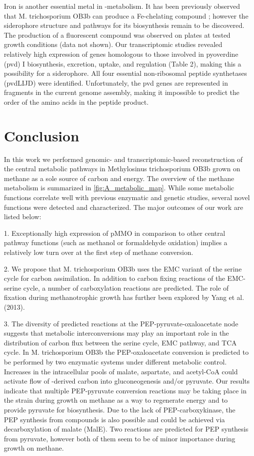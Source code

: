 Iron is another essential metal in -metabolism.
It has been previously observed that M. trichosporium OB3b can produce a Fe-chelating compound \cite{yoon2010}; however the siderophore structure and pathways for its biosynthesis remain to be discovered.
The production of a fluorescent compound was observed on plates at tested growth conditions (data not shown).
Our transcriptomic studies revealed relatively high expression of genes homologous to those involved in pyoverdine (pvd) I biosynthesis, excretion, uptake, and regulation (Table 2), making this a possibility for a siderophore.
All four essential non-ribosomal peptide synthetases (pvdLIJD) were identified.
Unfortunately, the pvd genes are represented in fragments in the current genome assembly, making it impossible to predict the order of the amino acids in the peptide product.

\section{Conclusion}

In this work we performed genomic- and transcriptomic-based reconstruction of the central metabolic pathways in Methylosinus trichosporium OB3b grown on methane as a sole source of carbon and energy.
The overview of the methane metabolism is summarized in \ref{fig:A_metabolic_map}.
While some metabolic functions correlate well with previous enzymatic and genetic studies, several novel functions were detected and characterized.
The major outcomes of our work are listed below:

1. Exceptionally high expression of pMMO in comparison to other central pathway functions (such as methanol or formaldehyde oxidation) implies a relatively low turn over at the first step of methane conversion.

2. We propose that M. trichosporium OB3b uses the EMC variant of the serine cycle for carbon assimilation.
In addition to carbon fixing reactions of the EMC-serine cycle, a number of carboxylation reactions are predicted.
The role of  fixation during methanotrophic growth has further been explored by Yang et al. (2013).

3. The diversity of predicted reactions at the PEP-pyruvate-oxaloacetate node suggests that metabolic interconversions may play an important role in the distribution of carbon flux between the serine cycle, EMC pathway, and TCA cycle.
In M. trichosporium OB3b the PEP-oxaloacetate conversion is predicted to be performed by two enzymatic systems under different metabolic control.
Increases in the intracellular pools of malate, aspartate, and acetyl-CoA could activate flow of -derived carbon into gluconeogenesis and/or pyruvate.
Our results indicate that multiple PEP-pyruvate conversion reactions may be taking place in the strain during growth on methane as a way to regenerate energy and to provide pyruvate for biosynthesis.
Due to the lack of PEP-carboxykinase, the PEP synthesis from  compounds is also possible and could be achieved via decarboxylation of malate (MalE).
Two reactions are predicted for PEP synthesis from pyruvate, however both of them seem to be of minor importance during growth on methane.

